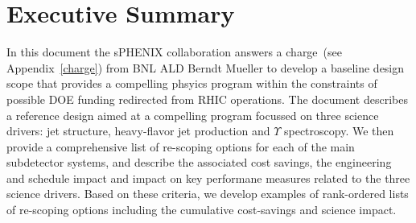 \section*{Executive Summary}
\label{executive_summary}
\setcounter{page}{1}

\nocite{*}

In this document the sPHENIX collaboration answers a charge~(see
Appendix~\ref{charge}) from BNL ALD Berndt Mueller to develop
a baseline design scope that provides a compelling phsyics program
within the constraints of possible DOE funding redirected from 
RHIC operations. The document describes a reference design aimed
at a compelling program focussed on three science drivers: jet structure,
heavy-flavor jet production and $\Upsilon$ spectroscopy. We then
provide a comprehensive list of re-scoping options for each
of the main subdetector systems, and describe the associated
cost savings, the engineering and schedule impact and impact on 
key performane measures related to the three science 
drivers. Based on these criteria, we develop examples of 
rank-ordered lists of re-scoping options including the 
cumulative cost-savings and science impact.



